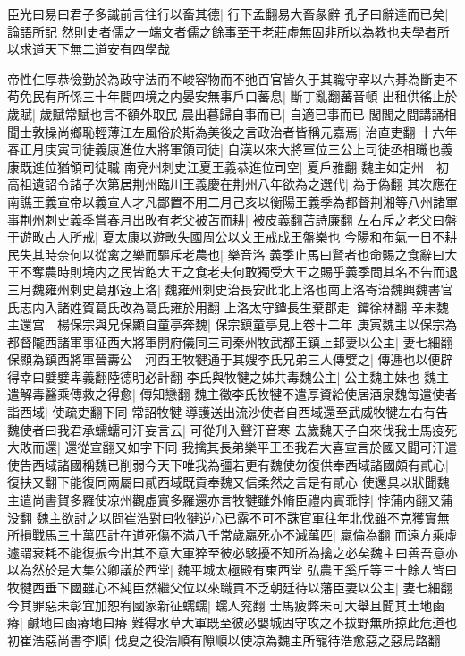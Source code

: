 臣光曰易曰君子多識前言往行以畜其德|{
	行下孟翻易大畜彖辭}
孔子曰辭達而已矣|{
	論語所記}
然則史者儒之一端文者儒之餘事至于老莊虛無固非所以為教也夫學者所以求道天下無二道安有四學哉

帝性仁厚恭儉勤於為政守法而不峻容物而不弛百官皆久于其職守宰以六朞為斷吏不苟免民有所係三十年間四境之内晏安無事戶口蕃息|{
	斷丁亂翻蕃音頓}
出租供徭止於歲賦|{
	歲賦常賦也言不額外取民}
晨出暮歸自事而已|{
	自適已事而已}
閭閻之間講誦相聞士敦操尚鄉恥輕薄江左風俗於斯為美後之言政治者皆稱元嘉焉|{
	治直吏翻}
十六年春正月庚寅司徒義康進位大將軍領司徒|{
	自漢以來大將軍位三公上司徒丞相職也義康既進位猶領司徒職}
南兗州刺史江夏王義恭進位司空|{
	夏戶雅翻}
魏主如定州　初高祖遺詔令諸子次第居荆州臨川王義慶在荆州八年欲為之選代|{
	為于偽翻}
其次應在南譙王義宣帝以義宣人才凡鄙置不用二月己亥以衡陽王義季為都督荆湘等八州諸軍事荆州刺史義季嘗春月出畋有老父被苫而耕|{
	被皮義翻苫詩廉翻}
左右斥之老父曰盤于遊畋古人所戒|{
	夏太康以遊畋失國周公以文王戒成王盤樂也}
今陽和布氣一日不耕民失其時奈何以從禽之樂而驅斥老農也|{
	樂音洛}
義季止馬曰賢者也命賜之食辭曰大王不奪農時則境内之民皆飽大王之食老夫何敢獨受大王之賜乎義季問其名不告而退　三月魏雍州刺史葛那宼上洛|{
	魏雍州刺史治長安此北上洛也南上洛寄治魏興魏書官氏志内入諸姓賀葛氏改為葛氏雍於用翻}
上洛太守鐔長生棄郡走|{
	鐔徐林翻}
辛未魏主還宫　楊保宗與兄保顯自童亭奔魏|{
	保宗鎮童亭見上卷十二年}
庚寅魏主以保宗為都督隴西諸軍事征西大將軍開府儀同三司秦州牧武都王鎮上邽妻以公主|{
	妻七細翻}
保顯為鎮西將軍晉夀公　河西王牧犍通于其嫂李氏兄弟三人傳嬖之|{
	傳逓也以便辟得幸曰嬖嬖卑義翻陸德明必計翻}
李氏與牧犍之姊共毒魏公主|{
	公主魏主妹也}
魏主遣解毒醫乘傳救之得愈|{
	傳知戀翻}
魏主徵李氏牧犍不遣厚資給使居酒泉魏每遣使者詣西域|{
	使疏吏翻下同}
常詔牧犍導護送出流沙使者自西域還至武威牧犍左右有告魏使者曰我君承蠕蠕可汗妄言云|{
	可從刋入聲汗音寒}
去歲魏天子自來伐我士馬疫死大敗而還|{
	還從宣翻又如字下同}
我擒其長弟樂平王丕我君大喜宣言於國又聞可汗遣使告西域諸國稱魏已削弱今天下唯我為彊若更有魏使勿復供奉西域諸國頗有貳心|{
	復扶又翻下能復同兩屬曰貳西域既貢奉魏又信柔然之言是有貳心}
使還具以狀聞魏主遣尚書賀多羅使凉州觀虛實多羅還亦言牧犍雖外脩臣禮内實乖悖|{
	悖蒲内翻又蒲没翻}
魏主欲討之以問崔浩對曰牧犍逆心已露不可不誅官軍往年北伐雖不克獲實無所損戰馬三十萬匹計在道死傷不滿八千常歲羸死亦不減萬匹|{
	羸倫為翻}
而遠方乘虛遽謂衰耗不能復振今出其不意大軍猝至彼必駭擾不知所為擒之必矣魏主曰善吾意亦以為然於是大集公卿議於西堂|{
	魏平城太極殿有東西堂}
弘農王奚斤等三十餘人皆曰牧犍西垂下國雖心不純臣然繼父位以來職貢不乏朝廷待以藩臣妻以公主|{
	妻七細翻}
今其罪惡未彰宜加恕宥國家新征蠕蠕|{
	蠕人兖翻}
士馬疲弊未可大舉且聞其土地鹵瘠|{
	鹹地曰鹵瘠地曰瘠}
難得水草大軍既至彼必嬰城固守攻之不拔野無所掠此危道也初崔浩惡尚書李順|{
	伐夏之役浩順有隙順以使凉為魏主所寵待浩愈惡之惡烏路翻}
